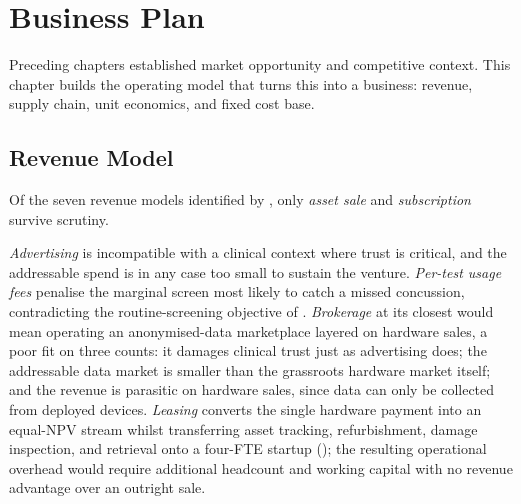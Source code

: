 \chapter{Business Plan}
\label{chapter:ent-business}

Preceding chapters established market opportunity and competitive context. This chapter builds the operating model that turns this into a business: revenue, supply chain, unit economics, and fixed cost base.


\section{Revenue Model}
\label{sec:ent-revenue}

Of the seven revenue models identified by \citet{osterwalder2010business}, only \textit{asset sale} and \textit{subscription} survive scrutiny. 

\textit{Advertising} is incompatible with a clinical context where trust is critical, and the addressable spend is in any case too small to sustain the venture. \textit{Per-test usage fees} penalise the marginal screen most likely to catch a missed concussion, contradicting the routine-screening objective of . \textit{Brokerage} at its closest would mean operating an anonymised-data marketplace layered on hardware sales, a poor fit on three counts: it damages clinical trust just as advertising does; the addressable data market is smaller than the grassroots hardware market itself; and the revenue is parasitic on hardware sales, since data can only be collected from deployed devices. \textit{Leasing} converts the single hardware payment into an equal-NPV stream whilst transferring asset tracking, refurbishment, damage inspection, and retrieval onto a four-FTE startup (); the resulting operational overhead would require additional headcount and working capital with no revenue advantage over an outright sale.

